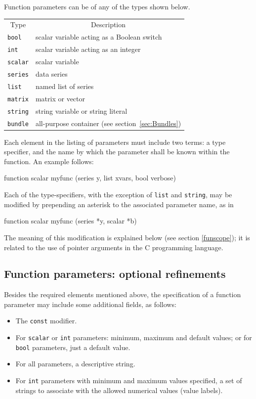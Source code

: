 Function parameters can be of any of the types shown below.

\begin{center}
\begin{tabular}{ll}
\multicolumn{1}{c}{Type} & 
\multicolumn{1}{c}{Description} \\ [4pt]
\texttt{bool}   & scalar variable acting as a Boolean switch \\
\texttt{int}    & scalar variable acting as an integer  \\
\texttt{scalar} & scalar variable \\
\texttt{series} & data series \\
\texttt{list}   & named list of series \\
\texttt{matrix} & matrix or vector \\
\texttt{string} & string variable or string literal \\
\texttt{bundle} & all-purpose container (see section~\ref{sec:Bundles})
\end{tabular}
\end{center}

Each element in the listing of parameters must include two terms: a
type specifier, and the name by which the parameter shall be known
within the function.  An example follows:
%    
\begin{code}
function scalar myfunc (series y, list xvars, bool verbose)
\end{code}

Each of the type-specifiers, with the exception of \texttt{list} and
\texttt{string}, may be modified by prepending an asterisk to the
associated parameter name, as in
%    
\begin{code}
function scalar myfunc (series *y, scalar *b)
\end{code}

The meaning of this modification is explained below (see section
\ref{funscope}); it is related to the use of pointer arguments in the
C programming language.

\subsection{Function parameters: optional refinements}

Besides the required elements mentioned above, the specification of a
function parameter may include some additional fields, as follows:
\begin{itemize}
\item The \texttt{const} modifier.
\item For \texttt{scalar} or \texttt{int} parameters: minimum, maximum
  and default values; or for \texttt{bool} parameters, just a default
  value.
\item For all parameters, a descriptive string.
\item For \texttt{int} parameters with minimum and maximum values
  specified, a set of strings to associate with the allowed numerical
  values (value labels).
\end{itemize}


